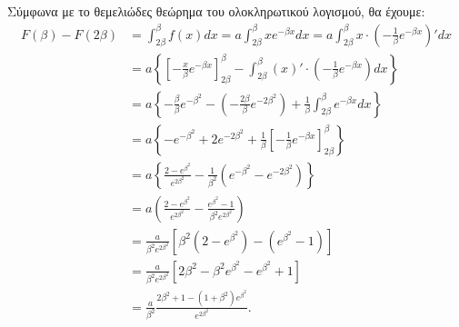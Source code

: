 \begin{alist}
    \item [γ)] Σύμφωνα με το θεμελιώδες θεώρημα του ολοκληρωτικού λογισμού, θα έχουμε:
    \begin{align*}
    F(\beta) - F(2\beta) &= \int_{2\beta}^{\beta} f(x)dx = a \int_{2\beta}^{\beta} xe^{-\beta x} dx = a \int_{2\beta}^{\beta} x \cdot \left(-\frac{1}{\beta} e^{-\beta x}\right)' dx \\
    &= a \left\{\left[-\frac{x}{\beta} e^{-\beta x}\right]_{2\beta}^{\beta} - \int_{2\beta}^{\beta}(x)' \cdot \left(-\frac{1}{\beta} e^{-\beta x}\right) dx\right\} \\
    &= a\left\{-\frac{\beta}{\beta} e^{-\beta^2} - \left(-\frac{2\beta}{\beta} e^{-2\beta^2}\right) + \frac{1}{\beta} \int_{2\beta}^{\beta} e^{-\beta x} dx\right\} \\
    &= a\left\{-e^{-\beta^2} + 2e^{-2\beta^2} + \frac{1}{\beta} \left[-\frac{1}{\beta} e^{-\beta x}\right]_{2\beta}^{\beta}\right\} \\
    &= a \left\{\frac{2-e^{\beta^2}}{e^{2\beta^2}} - \frac{1}{\beta^2} \left(e^{-\beta^2} - e^{-2\beta^2}\right)\right\} \\
    &= a \left(\frac{2-e^{\beta^2}}{e^{2\beta^2}} - \frac{e^{\beta^2}-1}{\beta^2 e^{2\beta^2}}\right) \\
    &= \frac{a}{\beta^2 e^{2\beta^2}} \left[\beta^2(2-e^{\beta^2}) - (e^{\beta^2}-1)\right] \\
    &= \frac{a}{\beta^2 e^{2\beta^2}} \left[2\beta^2 - \beta^2 e^{\beta^2} - e^{\beta^2} + 1\right] \\
    &= \frac{a}{\beta^2} \frac{2\beta^2+1-(1+\beta^2)e^{\beta^2}}{e^{2\beta^2}}.
    \end{align*}
\end{alist}